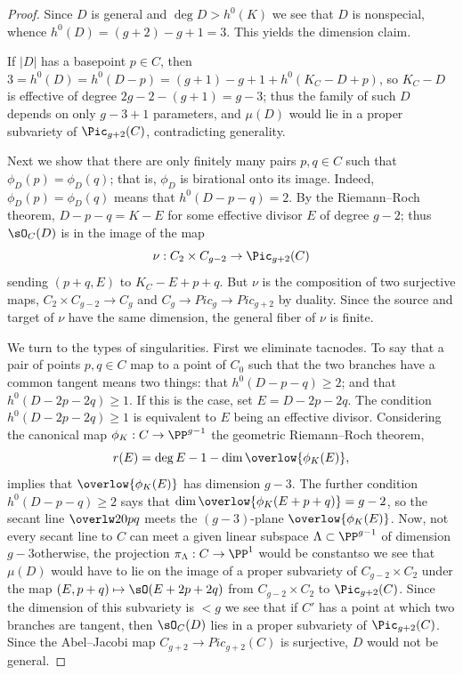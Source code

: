 \begin{proof}
Since $D$ is general and $\deg D > h^{0}(K)$ we see
that $D$ is nonspecial, whence $h^0(D) = (g+2)-g+1 = 3$.
This yields the dimension claim.

If $|D|$ 
has
a basepoint $p\in C$, then $3=h^0(D)
= h^0(D-p) = (g+1)-g+1+h^0(K_C-D+p)$,
so $K_C-D$ is effective of degree $2g-2-(g+1) =g-3$; thus the family of
such $D$ depends on only $g-3+1$ parameters,
and $\mu(D)$ would lie in a proper subvariety of $\Pic_{g+2}(C)$,
contradicting generality.

Next we show that
there are only finitely many pairs $p,
q \in C$ such that $\phi_D(p) = \phi_D(q)$; that is, $\phi_D$
is birational onto its image. 
Indeed, $\phi_D(p) = \phi_D(q)$
 means that $h^0(D-p-q) = 2$. By the Riemann--Roch
 theorem, $D-p-q = K-E$ for some effective divisor $E$ of degree $g-2$;
 thus $\sO_C(D)$ is in the image of the map
$$
\nu : C_2 \times C_{g-2} \to \Pic_{g+2}(C)
$$
sending $(p+q, E)$ to $K_C - E + p + q$.
But
$\nu$ is
the composition of two surjective maps, $C_2 \times C_{g-2} \to C_g$
and $C_g\to Pic_g \to Pic_{g+2}$ by duality. Since the source and
target of $\nu$ have the same dimension, the general fiber of $\nu$ is
finite. 

We turn to the types of singularities. First we eliminate tacnodes.
To say that a pair of points $p, q \in C$ map to
a point of $C_0$ such that the
two branches have a common tangent means two things: that $h^0(D-p-q)
\geq 2$; and that $h^0(D-2p-2q) \geq 1$. If this is the case, set $E =
D - 2p - 2q$.  The condition $h^0(D-2p-2q) \geq 1$ is equivalent to
$E$ being an effective divisor. Considering the canonical map $\phi_K:
C\to \PP^{g-1}$
the 
geometric Riemann--Roch theorem,
%
$$r(E) = \deg E -1-\dim\overlow{\phi_K(E)},$$ 
implies that $\overlow {\phi_K(E)}$ has
dimension $g-3$. The 
further
condition $h^0(D-p-q) \geq 2$ says that
$\dim\overlow{\phi_K(E+p+q)} = g-2$,
so the secant line $\overlw20{pq}$ meets the $(g-3)$-plane
$\overlow{\phi_K(E)}$. Now, not every secant line to $C$ can meet
a given linear subspace $\Lambda \subset \PP^{g-1}$ of dimension
$g-3$\emdash otherwise, the projection $\pi_\Lambda : C \to \PP^1$ would
be constant\emdash so we see that $\mu(D)$ would have to lie on the image
of a proper subvariety of $C_{g-2} \times C_2$ under the map $(E, p+q)
\mapsto \sO(E+2p+2q)$ from $C_{g-2} \times C_2$ to $\Pic_{g+2}(C)$.
Since the dimension of this subvariety is $<g$ we see that if $C'$ has
a point at which two branches are tangent, then $\sO_C(D)$ lies in a
proper subvariety of $\Pic_{g+2}(C)$. Since
the Abel--Jacobi map $C_{g+2} \to Pic_{g+2}(C)$ is surjective,
 $D$ would not be general.


\end{proof}
